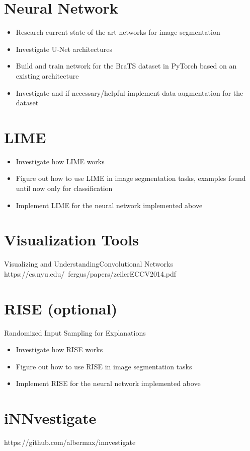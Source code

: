 \section*{Neural Network}

\begin{itemize}
    \item Research current state of the art networks for image segmentation
    \item Investigate U-Net architectures
    \item Build and train network for the BraTS dataset in PyTorch based on an existing architecture
    \item Investigate and if necessary/helpful implement data augmentation for the dataset
\end{itemize}


\iffalse

\section*{LIME}
\begin{itemize}
    \item Investigate how LIME works
    \item Figure out how to use LIME in image segmentation tasks, examples found until now only for classification
    \item Implement LIME for the neural network implemented above
\end{itemize}

\section*{Visualization Tools}
Visualizing and UnderstandingConvolutional Networks
https://cs.nyu.edu/~fergus/papers/zeilerECCV2014.pdf

\section*{RISE (optional)}
Randomized Input Sampling for Explanations
\begin{itemize}
    \item Investigate how RISE works
    \item Figure out how to use RISE in image segmentation tasks
    \item Implement RISE for the neural network implemented above
\end{itemize}

\section{iNNvestigate}
https://github.com/albermax/innvestigate

